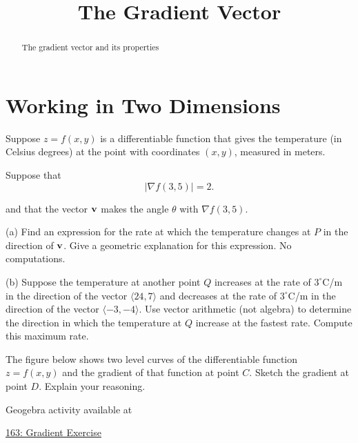 \documentclass{ximera}
\title{The Gradient Vector}
\begin{document}
\begin{abstract}
The gradient vector and its properties
\end{abstract}
\maketitle

\section{Working in Two Dimensions}

\begin{question}  \label{Qert4thbhg}
Suppose $z=f(x,y)$ is a differentiable function that gives the temperature (in Celsius degrees) at the point with coordinates $(x,y)$, measured in meters.

Suppose that 
\[
    \Big|  \nabla f(3,5) \Big| = 2 .
\]

and that the vector ${\bf v}$ makes the angle $\theta$ with $\nabla f(3,5)$.

(a) Find an expression for the rate at which the temperature changes at $P$ in the direction of ${\bf v}$. Give a geometric explanation for this expression. No computations.

(b) Suppose the temperature at another point $Q$ increases at the rate of $3^\circ$C/m in the direction of the vector $\langle 24,7\rangle$ and decreases at the rate of $3^\circ$C/m in the direction of the vector $\langle -3,-4\rangle$. Use vector arithmetic (not algebra) to determine the direction in which the temperature at $Q$ increase at the fastest rate. Compute this maximum rate.

\end{question}


\begin{question}  \label{Qdr4356}
The figure below shows two level curves of the differentiable function $z=f(x,y)$ and the gradient of that function at point $C$. Sketch the gradient at point $D$. Explain your reasoning.

 
\begin{onlineOnly}
    \begin{center}
\end{center}
\end{onlineOnly}

Geogebra activity available at

\href{https://www.geogebra.org/classic/zau4grcm}{163: Gradient Exercise}
\end{question}
\end{document}
